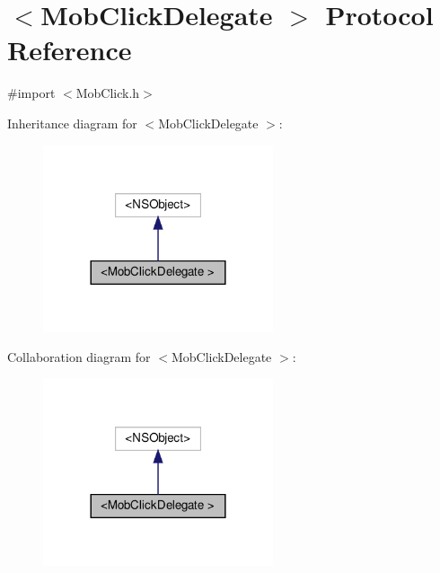 \hypertarget{protocolMobClickDelegate_01-p}{}\section{$<$Mob\+Click\+Delegate $>$ Protocol Reference}
\label{protocolMobClickDelegate_01-p}


{\ttfamily \#import $<$Mob\+Click.\+h$>$}



Inheritance diagram for $<$Mob\+Click\+Delegate $>$\+:
\nopagebreak
\begin{figure}[H]
\begin{center}
\leavevmode
\includegraphics[width=192pt]{protocolMobClickDelegate_01-p__inherit__graph}
\end{center}
\end{figure}


Collaboration diagram for $<$Mob\+Click\+Delegate $>$\+:
\nopagebreak
\begin{figure}[H]
\begin{center}
\leavevmode
\includegraphics[width=192pt]{protocolMobClickDelegate_01-p__coll__graph}
\end{center}
\end{figure}
